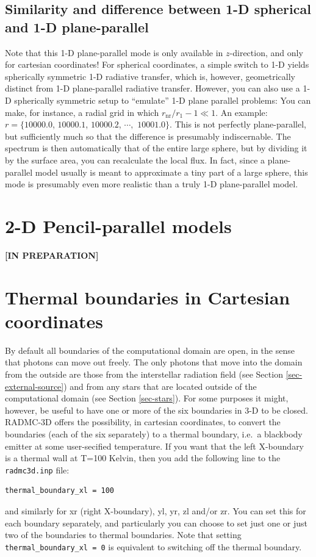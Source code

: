 \documentclass{report}
\newenvironment{asciibox}%
  {\begin{list}{}{%
    \setlength{\topsep}{0.5em}%
    \setlength{\parskip}{0em}%
    \setlength{\parsep}{0em}%
    \setlength{\itemsep}{0em}%
    \setlength{\rightmargin}{0em}%
    \setlength{\leftmargin}{3.0em}%
    \setlength{\labelsep}{1em}%
    \setlength{\labelwidth}{2em}%
  }\normalfont\footnotesize\item}
  {\end{list}}
\begin{document}
\subsection{Similarity and difference between 1-D spherical and 1-D plane-parallel}
Note that this 1-D plane-parallel mode is only available in $z$-direction,
and only for cartesian coordinates! For spherical coordinates, a simple
switch to 1-D yields spherically symmetric 1-D radiative transfer, which is,
however, geometrically distinct from 1-D plane-parallel radiative
transfer. However, you can also use a 1-D spherically symmetric setup to
``emulate'' 1-D plane parallel problems: You can make, for instance, a
radial grid in which $r_{\mathrm{nr}}/r_1-1\ll 1$. An example:
$r=\{10000.0$, $10000.1$, $10000.2$, $\cdots,$ $10001.0\}$. This is not
perfectly plane-parallel, but sufficiently much so that the difference is
presumably indiscernable.  The spectrum is then automatically that of the
entire large sphere, but by dividing it by the surface area, you can
recalculate the local flux.  In fact, since a plane-parallel model usually
is meant to approximate a tiny part of a large sphere, this mode is
presumably even more realistic than a truly 1-D plane-parallel model.


\section{2-D Pencil-parallel models}
%
\label{sec-2d-pencil-parallel}
%
{\bf [IN PREPARATION]}


\section{Thermal boundaries in Cartesian coordinates}
%
\label{sec-thermal-boundaries}
%
By default all boundaries of the computational domain are open, in the sense
that photons can move out freely. The only photons that move into the domain
from the outside are those from the interstellar radiation field (see
Section \ref{sec-external-source}) and from any stars that are located
outside of the computational domain (see Section \ref{sec-stars}). For
some purposes it might, however, be useful to have one or more of the
six boundaries in 3-D to be closed. RADMC-3D offers the possibility,
in cartesian coordinates, to convert the boundaries (each of the six
separately) to a thermal boundary, i.e.\ a blackbody emitter at some
user-secified temperature. If you want that the left X-boundary is a
thermal wall at T=100 Kelvin, then you add the following line to the
{\small\tt radmc3d.inp} file:
\begin{asciibox}\begin{verbatim}
thermal_boundary_xl = 100
\end{verbatim}\end{asciibox}
and similarly for xr (right X-boundary), yl, yr, zl and/or zr. You can set
this for each boundary separately, and particularly you can choose to set
just one or just two of the boundaries to thermal boundaries. Note that
setting {\small\tt thermal\_boundary\_xl = 0} is equivalent to switching off
the thermal boundary.
\end{document}
